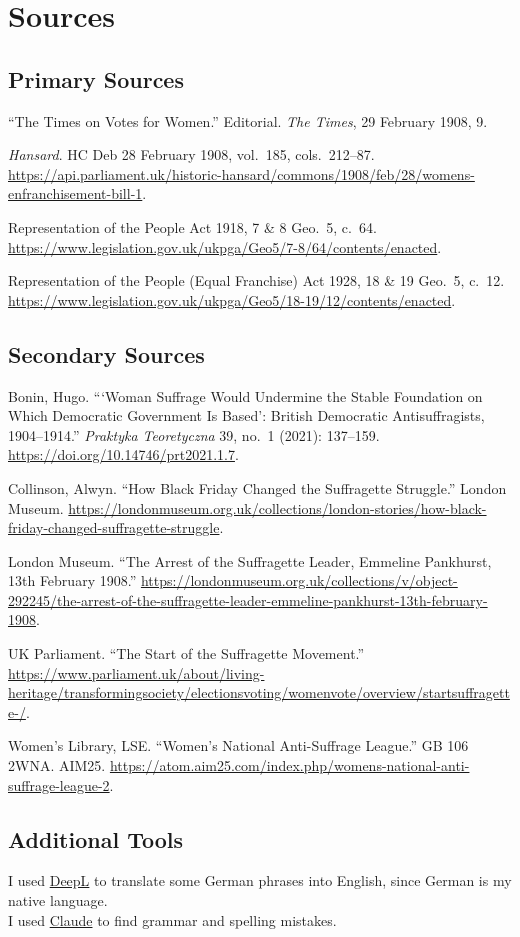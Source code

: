 \section*{Sources}

{\raggedright
\subsection*{Primary Sources}
\enquote{The Times on Votes for Women.} Editorial. \emph{The Times}, 29 February 1908, 9.

\emph{Hansard}. HC Deb 28 February 1908, vol.~185, cols.~212--87. \url{https://api.parliament.uk/historic-hansard/commons/1908/feb/28/womens-enfranchisement-bill-1}.

Representation of the People Act 1918, 7 \& 8 Geo.~5, c.~64. \url{https://www.legislation.gov.uk/ukpga/Geo5/7-8/64/contents/enacted}.

Representation of the People (Equal Franchise) Act 1928, 18 \& 19 Geo.~5, c.~12. \url{https://www.legislation.gov.uk/ukpga/Geo5/18-19/12/contents/enacted}.


\subsection*{Secondary Sources}
Bonin, Hugo. \enquote{\enquote{Woman Suffrage Would Undermine the Stable Foundation on Which Democratic Government Is Based}: British Democratic Antisuffragists, 1904--1914.} \emph{Praktyka Teoretyczna} 39, no.~1 (2021): 137--159. \url{https://doi.org/10.14746/prt2021.1.7}.

Collinson, Alwyn. \enquote{How Black Friday Changed the Suffragette Struggle.} London Museum. \url{https://londonmuseum.org.uk/collections/london-stories/how-black-friday-changed-suffragette-struggle}.

London Museum. \enquote{The Arrest of the Suffragette Leader, Emmeline Pankhurst, 13th February 1908.} \url{https://londonmuseum.org.uk/collections/v/object-292245/the-arrest-of-the-suffragette-leader-emmeline-pankhurst-13th-february-1908}.

UK Parliament. \enquote{The Start of the Suffragette Movement.} \url{https://www.parliament.uk/about/living-heritage/transformingsociety/electionsvoting/womenvote/overview/startsuffragette-/}.

Women's Library, LSE. \enquote{Women's National Anti-Suffrage League.} GB 106 2WNA. AIM25. \url{https://atom.aim25.com/index.php/womens-national-anti-suffrage-league-2}.


\subsection*{Additional Tools}
I used \href{https://www.deepl.com/en?tab=translate-text}{DeepL} to translate some German phrases into English, since German is my native language. \\
I used \href{https://claude.ai}{Claude} to find grammar and spelling mistakes.
\par
}
